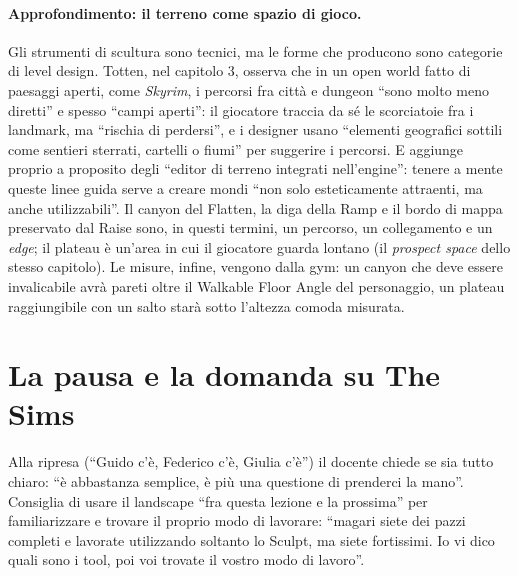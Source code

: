 \paragraph{Approfondimento: il terreno come spazio di gioco.} Gli strumenti di scultura
sono tecnici, ma le forme che producono sono categorie di level design. Totten, nel
capitolo 3, osserva che in un open world fatto di paesaggi aperti, come \emph{Skyrim}, i
percorsi fra città e dungeon ``sono molto meno diretti'' e spesso ``campi aperti'': il
giocatore traccia da sé le scorciatoie fra i landmark, ma ``rischia di perdersi'', e i
designer usano ``elementi geografici sottili come sentieri sterrati, cartelli o fiumi'' per
suggerire i percorsi. E aggiunge proprio a proposito degli ``editor di terreno integrati
nell'engine'': tenere a mente queste linee guida serve a creare mondi ``non solo
esteticamente attraenti, ma anche utilizzabili''. Il canyon del Flatten, la diga della Ramp
e il bordo di mappa preservato dal Raise sono, in questi termini, un percorso, un
collegamento e un \emph{edge}; il plateau è un'area in cui il giocatore guarda lontano (il
\emph{prospect space} dello stesso capitolo). Le misure, infine, vengono dalla gym: un
canyon che deve essere invalicabile avrà pareti oltre il Walkable Floor Angle del
personaggio, un plateau raggiungibile con un salto starà sotto l'altezza comoda misurata.

\section{La pausa e la domanda su The Sims}
\label{ue14:sec:pausa}

Alla ripresa (``Guido c'è, Federico c'è, Giulia c'è'') il docente chiede se sia tutto
chiaro: ``è abbastanza semplice, è più una questione di prenderci la mano''. Consiglia di
usare il landscape ``fra questa lezione e la prossima'' per familiarizzare e trovare il
proprio modo di lavorare: ``magari siete dei pazzi completi e lavorate utilizzando soltanto
lo Sculpt, ma siete fortissimi. Io vi dico quali sono i tool, poi voi trovate il vostro
modo di lavoro''.

